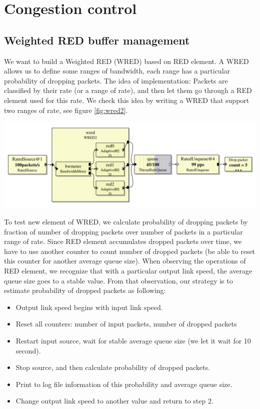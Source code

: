 \documentclass[a4paper]{article}
\begin{document}
  \section{Congestion control}
  \subsection{Weighted RED buffer management}
  We want to build a Weighted RED (WRED) based on RED element. A WRED allows us to define some ranges of bandwidth, each range has a particular probability of dropping packets. The idea of implementation: Packets are classified by their rate (or a range of rate), and then let them go through a RED element used for this rate. We check this idea by writing a WRED that support two ranges of rate, see figure \ref{fig:wred2}.
    \begin{center}
	  \includegraphics[scale=0.5]{wred2.pdf}
	  \label{fig:wred2}
    \end{center}
  To test new element of WRED, we calculate probability of dropping packets by fraction of number of dropping packets over number of packets in a particular range of rate. Since RED element accumulates dropped packets over time, we have to use another counter to count number of dropped packets (be able to reset this counter for another average queue size). When observing the operations of RED element, we recognize that with a particular output link speed, the average queue size goes to a stable value. From that observation, our strategy is to estimate probability of dropped packets as following:
  \begin{itemize}
  	\item Output link speed begins with input link speed.
  	\item Reset all counters: number of input packets, number of dropped packets
  	\item Restart input source, wait for stable average queue size (we let it wait for 10 second).
  	\item Stop source, and then calculate probability of dropped packets.
  	\item Print to log file information of this probability and average queue size.
  	\item Change output link speed to another value and return to step 2.
  \end{itemize}
\end{document}
